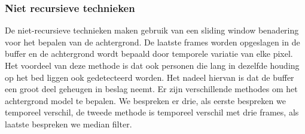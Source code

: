 \subsubsection{Niet recursieve technieken}
\label{refNRT}
De niet-recursieve technieken maken gebruik van een sliding window benadering voor het bepalen van de achtergrond. De laatste frames worden opgeslagen in de buffer en de achtergrond wordt bepaald door temporele variatie van elke pixel. Het voordeel van deze methode is dat ook personen die lang in dezelfde houding op het bed liggen ook gedetecteerd worden. Het nadeel hiervan is dat de buffer een groot deel geheugen in beslag neemt. Er zijn verschillende methodes om het achtergrond model te bepalen. We bespreken er drie, als eerste bespreken we temporeel verschil, de tweede methode is temporeel verschil met drie frames, als laatste bespreken we median filter.

